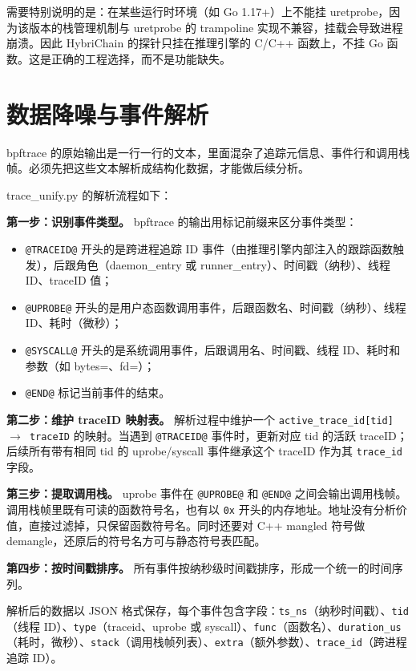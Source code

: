 需要特别说明的是：在某些运行时环境（如 Go 1.17+）上不能挂 uretprobe，因为该版本的栈管理机制与 uretprobe 的 trampoline 实现不兼容，挂载会导致进程崩溃。因此 HybriChain 的探针只挂在推理引擎的 C/C++ 函数上，不挂 Go 函数。这是正确的工程选择，而不是功能缺失。

\section{数据降噪与事件解析}

bpftrace 的原始输出是一行一行的文本，里面混杂了追踪元信息、事件行和调用栈帧。必须先把这些文本解析成结构化数据，才能做后续分析。

trace\_unify.py 的解析流程如下：

\textbf{第一步：识别事件类型。} bpftrace 的输出用标记前缀来区分事件类型：
\begin{itemize}
    \item \texttt{@TRACEID@} 开头的是跨进程追踪 ID 事件（由推理引擎内部注入的跟踪函数触发），后跟角色（daemon\_entry 或 runner\_entry）、时间戳（纳秒）、线程 ID、traceID 值；
    \item \texttt{@UPROBE@} 开头的是用户态函数调用事件，后跟函数名、时间戳（纳秒）、线程 ID、耗时（微秒）；
    \item \texttt{@SYSCALL@} 开头的是系统调用事件，后跟调用名、时间戳、线程 ID、耗时和参数（如 bytes=、fd=）；
    \item \texttt{@END@} 标记当前事件的结束。
\end{itemize}

\textbf{第二步：维护 traceID 映射表。} 解析过程中维护一个 \texttt{active\_trace\_id[tid] $\to$ traceID} 的映射。当遇到 \texttt{@TRACEID@} 事件时，更新对应 tid 的活跃 traceID；后续所有带有相同 tid 的 uprobe/syscall 事件继承这个 traceID 作为其 \texttt{trace\_id} 字段。

\textbf{第三步：提取调用栈。} uprobe 事件在 \texttt{@UPROBE@} 和 \texttt{@END@} 之间会输出调用栈帧。调用栈帧里既有可读的函数符号名，也有以 \texttt{0x} 开头的内存地址。地址没有分析价值，直接过滤掉，只保留函数符号名。同时还要对 C++ mangled 符号做 demangle，还原后的符号名方可与静态符号表匹配。

\textbf{第四步：按时间戳排序。} 所有事件按纳秒级时间戳排序，形成一个统一的时间序列。

解析后的数据以 JSON 格式保存，每个事件包含字段：\texttt{ts\_ns}（纳秒时间戳）、\texttt{tid}（线程 ID）、\texttt{type}（traceid、uprobe 或 syscall）、\texttt{func}（函数名）、\texttt{duration\_us}（耗时，微秒）、\texttt{stack}（调用栈帧列表）、\texttt{extra}（额外参数）、\texttt{trace\_id}（跨进程追踪 ID）。

